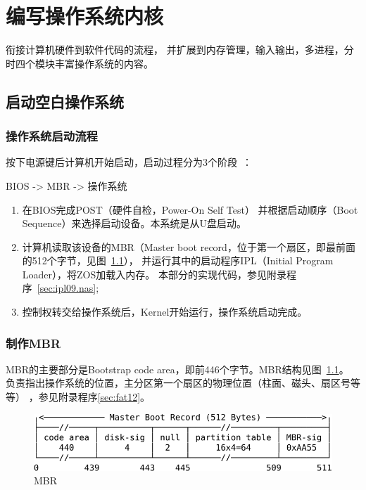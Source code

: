 \chapter{编写操作系统内核}

衔接计算机硬件到软件代码的流程，
并扩展到内存管理，输入输出，多进程，分时四个模块丰富操作系统的内容。

\section{启动空白操作系统}

\subsection{操作系统启动流程}

按下电源键后计算机开始启动，启动过程分为3个阶段~\cite{阮一峰2014如何变得有思想}：
\begin{center}BIOS -> MBR -> 操作系统\end{center}

\begin{enumerate}
\item 在BIOS完成POST（硬件自检，Power-On Self Test）
  并根据启动顺序（Boot Sequence）来选择启动设备。本系统是从U盘启动。
\item 计算机读取该设备的MBR（Master boot record，位于第一个扇区，即最前面的512个字节，见图~\ref{fig:mbr}），
  并运行其中的启动程序IPL（Initial Program Loader），将ZOS加载入内存。
  本部分的实现代码，参见附录程序~\ref{sec:ipl09.nas};
\item 控制权转交给操作系统后，Kernel开始运行，操作系统启动完成。
\end{enumerate}

\subsection{制作MBR}

MBR的主要部分是Bootstrap code area，即前446个字节。MBR结构见图~\ref{fig:mbr}。
负责指出操作系统的位置，主分区第一个扇区的物理位置（柱面、磁头、扇区号等等）
，参见附录程序\ref{sec:fat12}。

\begin{figure}[H]
  \centering
  \includegraphics[width=1\textwidth]{fig/mbr.pdf}
  \caption{MBR}
  \label{fig:mbr}
\end{figure}

